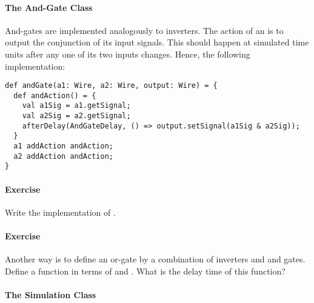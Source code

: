 \documentclass[a4paper,12pt,twoside,titlepage]{book}
\newcommand{\exercise}{\paragraph{Exercise}}
\begin{document}
{\paragraph{The And-Gate Class}
And-gates are implemented analogously to inverters.  The action of an
 is to output the conjunction of its input signals.
This should happen at  simulated time units after
any one of its two inputs changes. Hence, the following implementation:
\begin{lstlisting}
def andGate(a1: Wire, a2: Wire, output: Wire) = {
  def andAction() = {
    val a1Sig = a1.getSignal;
    val a2Sig = a2.getSignal;
    afterDelay(AndGateDelay, () => output.setSignal(a1Sig & a2Sig));
  }
  a1 addAction andAction;
  a2 addAction andAction;
}
\end{lstlisting}

\exercise Write the implementation of .

\exercise Another way is to define an or-gate by a combination of
inverters and and gates. Define a function  in terms of
 and . What is the delay time of this function?

\paragraph{The Simulation Class}

}
\end{document}
